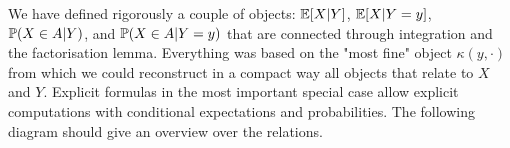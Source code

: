 		We have defined rigorously a couple of objects: $\E[X|Y]$, $\E[X|Y=y]$, $\P(X\in A|Y)$, and $\P(X\in A|Y=y)$ that are connected through integration and the factorisation lemma. Everything was based on the "{}most fine"{} object $\kappa(y,\cdot)$ from which we could reconstruct in a compact way all objects that relate to $X$ and $Y$. Explicit formulas in the most important special case allow explicit computations with conditional expectations and probabilities. The following diagram should give an overview over the relations. 

